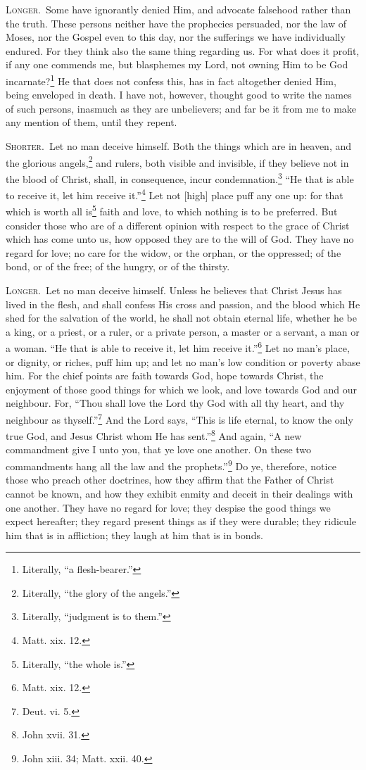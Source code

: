 \textsc{Longer.}~Some have ignorantly denied Him, and advocate falsehood rather than the truth. These persons neither have the prophecies persuaded, nor the law of Moses, nor the Gospel even to this day, nor the sufferings we have individually endured. For they think also the same thing regarding us. For what does it profit, if any one commends me, but blasphemes my Lord, not owning Him to be God incarnate?\footnote{Literally, “a flesh-bearer.”} He that does not confess this, has in fact altogether denied Him, being enveloped in death. I have not, however, thought good to write the names of such persons, inasmuch as they are unbelievers; and far be it from me to make any mention of them, until they repent.


\textsc{Shorter.}~Let no man deceive himself. Both the things which are in heaven, and the glorious angels,\footnote{Literally, “the glory of the angels.”} and rulers, both visible and invisible, if they believe not in the blood of Christ, shall, in  consequence, incur condemnation.\footnote{Literally, “judgment is to them.”} “He that is able to receive it, let him receive it.”\footnote{Matt. xix. 12.} Let not [high] place puff any one up: for that which is worth all is\footnote{Literally, “the whole is.”} faith and love, to which nothing is to be preferred. But consider those who are of a different opinion with respect to the grace of Christ which has come unto us, how opposed they are to the will of God. They have no regard for love; no care for the widow, or the orphan, or the oppressed; of the bond, or of the free; of the hungry, or of the thirsty.

\textsc{Longer.}~Let no man deceive himself. Unless he believes that Christ Jesus has lived in the flesh, and shall confess His cross and passion, and the blood which He shed for the salvation of the world, he shall not obtain eternal life, whether he be a king, or a priest, or a ruler, or a private person, a master or a servant, a man or a woman. “He that is able to receive it, let him receive it.”\footnote{Matt. xix. 12.} Let no man’s place, or dignity, or riches, puff him up; and let no man’s low condition or poverty abase him. For the chief points are faith towards God, hope towards Christ, the enjoyment of those good things for which we look, and love towards God and our neighbour. For, “Thou shall love the Lord thy God with all thy heart, and thy neighbour as thyself.”\footnote{Deut. vi. 5.} And the Lord says, “This is life eternal, to know the only true God, and Jesus Christ whom He has sent.”\footnote{John xvii. 31.} And again, “A new commandment give I unto you, that ye love one another. On these two commandments hang all the law and the prophets.”\footnote{John xiii. 34; Matt. xxii. 40.} Do ye, therefore, notice those who preach other doctrines, how they affirm that the Father of Christ cannot be known, and how they exhibit enmity and deceit in their dealings with one another. They have no regard for love; they despise the good things we expect hereafter; they regard present things as if they were durable; they ridicule him that is in affliction; they laugh at him that is in bonds.

